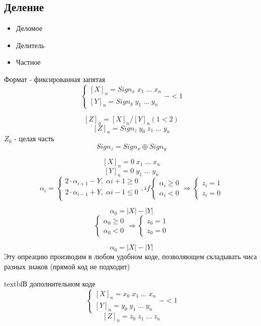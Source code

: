 \documentclass[12px]{article}
\begin{document}
\subsection{Деление}
\begin{itemize}
	\item Деломое 
	\item Делитель 
	\item Частное
\end{itemize}

Формат - фиксированная запятая
\[
\begin{cases}
	[X]_n = Sign_x \; x_1\; ...\; x_n \\
	[Y]_n = Sign_y \; y_1\; ...\; y_n
\end{cases} - < 1 
\]

\[ [Z]_n = [X]_n / [Y]_n (1 < 2) \]
\[ [Z]_n = Sign_z \; y_0\; z_1\; ...\; y_n \]
$Z_0$ - целая часть
\[ Sign_z = Sign_x \oplus Sign_y \]

\[ [X]_n = 0 \; x_1\; ...\; x_n \]
\[ [Y]_n = 0 \; y_1\; ...\; y_n \]
\[ \alpha_i = 
\begin{cases}
	2\cdot\alpha_{i+1} - Y,\; \alpha{i+1} \geq 0\\
	2\cdot\alpha_{i-1} + Y,\; \alpha{i-1} \leq 0\\
\end{cases}, if 
\begin{cases}
	\alpha_i \geq 0\\
	\alpha_i < 0
\end{cases} \Rightarrow
\begin{cases}
	z_i= 1\\
	z_i = 0
\end{cases}
\]

\[ \alpha_0 = |X| - |Y| \]
\[
\begin{cases}
	\alpha_0 \geq 0\\
	\alpha_0 < 0 
\end{cases} \Rightarrow 
\begin{cases}
	z_0 = 1\\
	z_0 = 0
\end{cases}
\]

\[ \alpha_0 = |X| - |Y| \]
Эту опреацию производим в любом удобном коде, позволяющем складывать чиса разных знаков (прямой код не подходит) 

textbf{В дополнительном коде}\\
\[
\begin{cases}
	[X]_n = x_0 \; x_1\; ...\; x_n \\
	[Y]_n = y_0 \; y_1\; ...\; y_n
\end{cases} - < 1 
\]
\[ [Z]_n = z_0 \; z_1\; ...\; z_n \]
\end{document}
